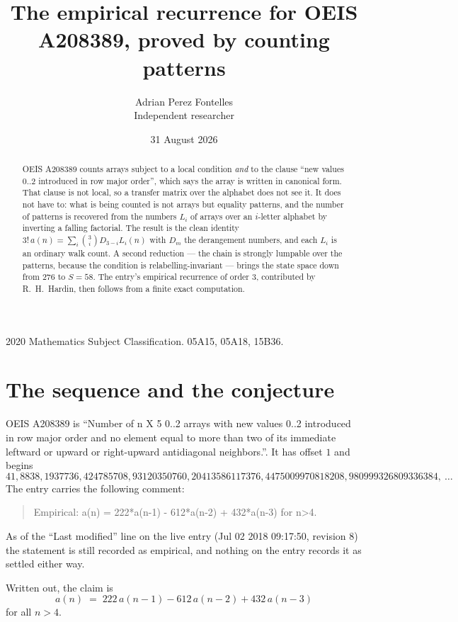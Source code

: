 \documentclass[11pt,a4paper]{article}
\title{The empirical recurrence for OEIS A208389, proved by counting patterns}
\author{Adrian Perez Fontelles\\ \small Independent researcher}
\date{31 August 2026}
\theoremstyle{plain}
\theoremstyle{definition}
\begin{document}
\maketitle

\begin{abstract}
OEIS A208389 counts arrays subject to a local condition \emph{and} to the clause ``new values
$0..2$ introduced in row major order'', which says the array is written in canonical
form. That clause is not local, so a transfer matrix over the alphabet does not see it. It
does not have to: what is being counted is not arrays but equality patterns, and the number
of patterns is recovered from the numbers $L_i$ of arrays over an $i$-letter alphabet by
inverting a falling factorial. The result is the clean identity
$3!\,a(n)=\sum_i\binom{3}{i}D_{3-i}L_i(n)$ with $D_m$ the derangement numbers,
and each $L_i$ is an ordinary walk count. A second reduction --- the chain is strongly
lumpable over the patterns, because the condition is relabelling-invariant --- brings the
state space down from $276$ to $S=58$. The entry's empirical recurrence of order
$3$, contributed by R.~H.~Hardin, then follows from a finite exact computation.
\end{abstract}

\noindent\small 2020 Mathematics Subject Classification. 05A15, 05A18, 15B36.\normalsize

\section{The sequence and the conjecture}

OEIS A208389 is ``Number of n X 5 0..2 arrays with new values 0..2 introduced in row major order and no element equal to more than two of its immediate leftward or upward or right-upward antidiagonal neighbors.''. It has offset $1$ and begins
\[
41, 8838, 1937736, 424785708, 93120350760, 20413586117376, 4475009970818208, 980999326809336384,\ \dots
\]
The entry carries the following comment:
\begin{quote}\small
Empirical: a(n) = 222*a(n-1) - 612*a(n-2) + 432*a(n-3) for n>4.
\end{quote}
As of the ``Last modified'' line on the live entry (Jul 02 2018 09:17:50, revision 8) the statement is
still recorded as empirical, and nothing on the entry records it as settled either way.

Written out, the claim is
\begin{equation}\label{eq:conj}
a(n)\;=\;222\,a(n-1) - 612\,a(n-2) + 432\,a(n-3)
\end{equation}
for all $n>4$.
\end{document}
